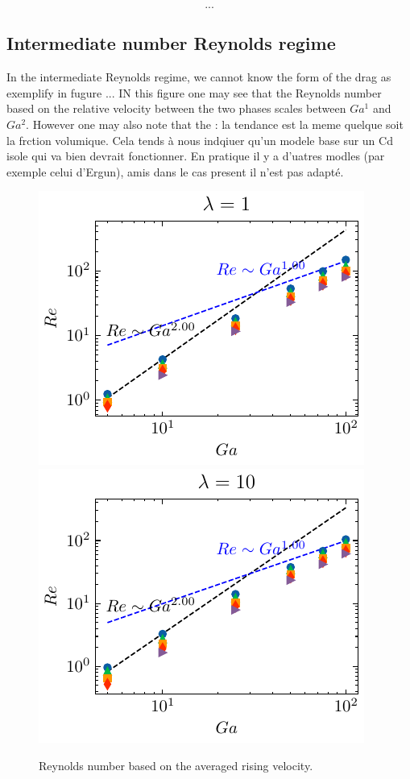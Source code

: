 \begin{equation}
...
\end{equation}












\subsection{Intermediate number Reynolds regime}

In the intermediate Reynolds regime, we cannot know the form of the drag as exemplify in fugure ... IN this figure one may see that the Reynolds number based on the relative velocity between the two phases scales between $Ga^1$ and $Ga^2$. However one may also note that the : la tendance est la meme quelque soit la frction volumique. Cela tends à nous indqiuer qu'un modele base sur un Cd isole qui va bien devrait fonctionner. En pratique il y a d'uatres modles (par exemple celui d'Ergun), amis dans le cas present il n'est pas adapté.

\begin{figure}
\centering
    \includegraphics[height = 0.35\textwidth]{image/HOMOGENEOUS/fCA/Re_mu_r_1-0.pdf}
    \includegraphics[height = 0.35\textwidth]{image/HOMOGENEOUS/fCA/Re_mu_r_0-1.pdf}
    \caption{Reynolds number based on the averaged rising velocity.}
\end{figure}
 



